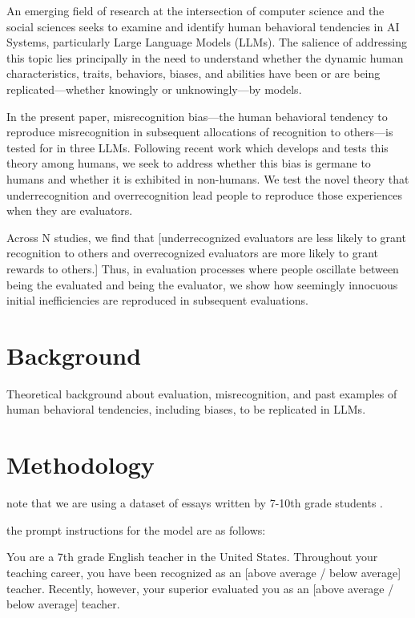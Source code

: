 \documentclass[letterpaper]{article} %
\begin{document}
An emerging field of research at the intersection of computer science and the social sciences seeks to examine and identify human behavioral tendencies in AI Systems, particularly Large Language Models (LLMs). The salience of addressing this topic lies principally in the need to understand whether the dynamic human characteristics, traits, behaviors, biases, and abilities have been or are being replicated---whether knowingly or unknowingly---by models.

In the present paper, misrecognition bias---the human behavioral tendency to reproduce misrecognition in subsequent allocations of recognition to others---is tested for in three LLMs. Following recent work \cite{Abraham2025Not} which develops and tests this theory among humans, we seek to address whether this bias is germane to humans and whether it is exhibited in non-humans. We test the novel theory that underrecognition and overrecognition lead people to reproduce those experiences when they are evaluators.

Across N studies, we find that [underrecognized evaluators are less likely to grant recognition to others and overrecognized evaluators are more likely to grant rewards to others.] Thus, in evaluation processes where people oscillate between being the evaluated and being the evaluator, we show how seemingly innocuous initial inefficiencies are reproduced in subsequent evaluations. 

\section{Background}

Theoretical background about evaluation, misrecognition, and past examples of human behavioral tendencies, including biases, to be replicated in LLMs.

\section{Methodology}

note that we are using a dataset of essays written by 7-10th grade students \cite{asap-aes}.

the prompt instructions for the model are as follows:

You are a 7th grade English teacher in the United States. Throughout your teaching career, you have been recognized as an [above average / below average] teacher. Recently, however, your superior evaluated you as an [above average / below average] teacher.
\end{document}
